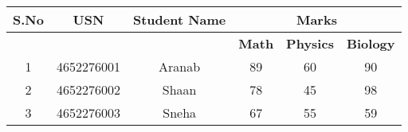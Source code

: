 \documentclass{article}
\begin{document}
\begin{tabular}{|c|c|c|c|c|c|}
\hline
\textbf{S.No} & \textbf{USN} & \textbf{Student Name} & \multicolumn{3}{c|}{\textbf{Marks}} \\ \hline
              &              &                       & \textbf{Math} & \textbf{Physics} & \textbf{Biology} \\ \hline
1             & 4652276001   & Aranab                & 89                & 60                & 90                \\ \hline
2             & 4652276002   & Shaan                 & 78                & 45                & 98                \\ \hline
3             & 4652276003   & Sneha                 & 67                & 55                & 59                \\ \hline
\end{tabular}
\end{document}
